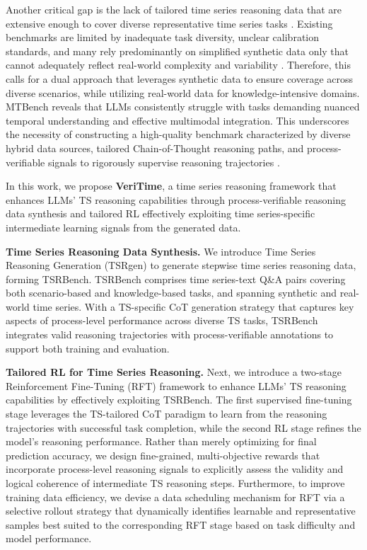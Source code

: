 \documentclass{article}
\newcommand{\partitle}[1]{\smallskip \noindent \textbf{#1.}}
\theoremstyle{plain}
\theoremstyle{definition}
\theoremstyle{remark}
\begin{document}
Another critical gap is the lack of tailored time series reasoning data that are extensive enough to cover diverse representative time series tasks \cite{icml2525verbalts, gonen2025Scarcity}. Existing benchmarks are limited by inadequate task diversity, unclear calibration standards, and many rely predominantly on simplified synthetic data only that cannot adequately reflect real-world complexity and variability \cite{kong2025position, wang2023tram}. Therefore, this calls for a dual approach that leverages synthetic data to ensure coverage across diverse scenarios, while utilizing real-world data for knowledge-intensive domains. MTBench \cite{chen2025mtbench} reveals that LLMs consistently struggle with tasks demanding nuanced temporal understanding and effective multimodal integration. This underscores the necessity of constructing a high-quality benchmark characterized by diverse hybrid data sources, tailored Chain-of-Thought reasoning paths, and process-verifiable signals to rigorously supervise reasoning trajectories \cite{nips25forging}.


In this work, we propose \textbf{VeriTime}, a time series reasoning framework that enhances LLMs' TS reasoning capabilities through process-verifiable reasoning data synthesis and tailored RL  effectively exploiting time series-specific intermediate learning signals from the generated data. 

\partitle{Time Series Reasoning Data Synthesis} We introduce Time Series Reasoning Generation (TSRgen) to generate stepwise time series reasoning data, forming TSRBench. TSRBench comprises time series-text Q\&A pairs covering both scenario-based and knowledge-based tasks, and spanning synthetic and real-world time series. With a TS-specific CoT generation strategy that captures key aspects of process-level performance across diverse TS tasks, TSRBench integrates valid reasoning trajectories with process-verifiable annotations to support both training and evaluation.

\partitle{Tailored RL for Time Series Reasoning} Next, we introduce a two-stage Reinforcement Fine-Tuning (RFT) framework to enhance LLMs' TS reasoning capabilities by effectively exploiting TSRBench. The first supervised fine-tuning stage leverages the TS-tailored CoT paradigm to learn from the reasoning trajectories with successful task completion, while the second RL stage refines the model's reasoning performance. Rather than merely optimizing for final prediction accuracy, we design fine-grained, multi-objective rewards that incorporate process-level reasoning signals to explicitly assess the validity and logical coherence of intermediate TS reasoning steps. Furthermore, to improve training data efficiency, we devise a data scheduling mechanism for RFT via a selective rollout strategy that dynamically identifies learnable and representative samples best suited to the corresponding RFT stage based on task difficulty and model performance.
\end{document}
